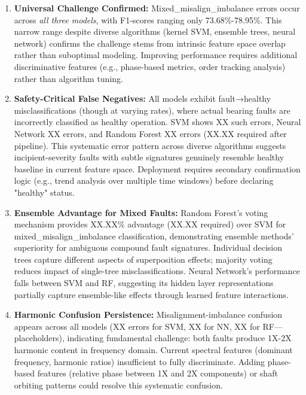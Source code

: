 \documentclass[11pt,a4paper]{article}
\begin{document}
\begin{enumerate}[leftmargin=*, itemsep=0.3em]
    \item \textbf{Universal Challenge Confirmed:} Mixed\_misalign\_imbalance errors occur across \textit{all three models}, with F1-scores ranging only 73.68\%-78.95\%. This narrow range despite diverse algorithms (kernel SVM, ensemble trees, neural network) confirms the challenge stems from intrinsic feature space overlap rather than suboptimal modeling. Improving performance requires additional discriminative features (e.g., phase-based metrics, order tracking analysis) rather than algorithm tuning.

    \item \textbf{Safety-Critical False Negatives:} All models exhibit fault→healthy misclassifications (though at varying rates), where actual bearing faults are incorrectly classified as healthy operation. SVM shows XX such errors, Neural Network XX errors, and Random Forest XX errors (XX.XX required after pipeline). This systematic error pattern across diverse algorithms suggests incipient-severity faults with subtle signatures genuinely resemble healthy baseline in current feature space. Deployment requires secondary confirmation logic (e.g., trend analysis over multiple time windows) before declaring "healthy" status.

    \item \textbf{Ensemble Advantage for Mixed Faults:} Random Forest's voting mechanism provides XX.XX\% advantage (XX.XX required) over SVM for mixed\_misalign\_imbalance classification, demonstrating ensemble methods' superiority for ambiguous compound fault signatures. Individual decision trees capture different aspects of superposition effects; majority voting reduces impact of single-tree misclassifications. Neural Network's performance falls between SVM and RF, suggesting its hidden layer representations partially capture ensemble-like effects through learned feature interactions.

    \item \textbf{Harmonic Confusion Persistence:} Misalignment-imbalance confusion appears across all models (XX errors for SVM, XX for NN, XX for RF—placeholders), indicating fundamental challenge: both faults produce 1X-2X harmonic content in frequency domain. Current spectral features (dominant frequency, harmonic ratios) insufficient to fully discriminate. Adding phase-based features (relative phase between 1X and 2X components) or shaft orbiting patterns could resolve this systematic confusion.


\end{enumerate}
\end{document}
